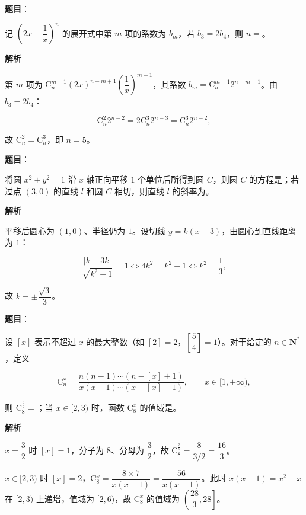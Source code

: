 \begin{answer}

\textbf{题目}：

记 $\left(2x+\dfrac1x\right)^n$ 的展开式中第 $m$ 项的系数为 $b_m$，若 $b_3=2b_4$，则 $n=$\gkblank{}。

\textbf{解析}

第 $m$ 项为 $\mathrm C_n^{m-1}(2x)^{n-m+1}\left(\dfrac1x\right)^{m-1}$，其系数 $b_m=\mathrm C_n^{m-1}2^{n-m+1}$。由 $b_3=2b_4$：

\nopagebreak[4]
\[\mathrm C_n^2 2^{n-2}=2\mathrm C_n^3 2^{n-3}=\mathrm C_n^3 2^{n-2},\]

故 $\mathrm C_n^2=\mathrm C_n^3$，即 $n=5$。


\end{answer}
\begin{answer}

\textbf{题目}：

将圆 $x^2+y^2=1$ 沿 $x$ 轴正向平移 $1$ 个单位后所得到圆 $C$，则圆 $C$ 的方程是\gkblank{}；若过点 $(3,0)$ 的直线 $l$ 和圆 $C$ 相切，则直线 $l$ 的斜率为\gkblank{}。

\textbf{解析}

平移后圆心为 $(1,0)$、半径仍为 $1$。设切线 $y=k(x-3)$，由圆心到直线距离为 $1$：

\nopagebreak[4]
\[\frac{|k-3k|}{\sqrt{k^2+1}}=1\iff 4k^2=k^2+1\iff k^2=\frac13,\]

故 $k=\pm\dfrac{\sqrt3}3$。


\end{answer}
\begin{answer}

\textbf{题目}：

设 $[x]$ 表示不超过 $x$ 的最大整数（如 $[2]=2$，$\left[\dfrac54\right]=1$）。对于给定的 $n\in\mathbf N^*$，定义

\nopagebreak[4]
\[\mathrm C_n^x=\frac{n(n-1)\cdots(n-[x]+1)}{x(x-1)\cdots(x-[x]+1)},\qquad x\in[1,+\infty),\]

则 $\mathrm C_8^{\frac32}=$\gkblank{}；当 $x\in[2,3)$ 时，函数 $\mathrm C_8^x$ 的值域是\gkblank{}。

\textbf{解析}

$x=\dfrac32$ 时 $[x]=1$，分子为 $8$、分母为 $\dfrac32$，故 $\mathrm C_8^{\frac32}=\dfrac8{3/2}=\dfrac{16}3$。

$x\in[2,3)$ 时 $[x]=2$，$\mathrm C_8^x=\dfrac{8\times7}{x(x-1)}=\dfrac{56}{x(x-1)}$。此时 $x(x-1)=x^2-x$ 在 $[2,3)$ 上递增，值域为 $[2,6)$，故 $\mathrm C_8^x$ 的值域为 $\left(\dfrac{28}3,28\right]$。

\gkanswer{答案：$\dfrac{16}3$；$\left(\dfrac{28}3,28\right]$。}

\end{answer}
